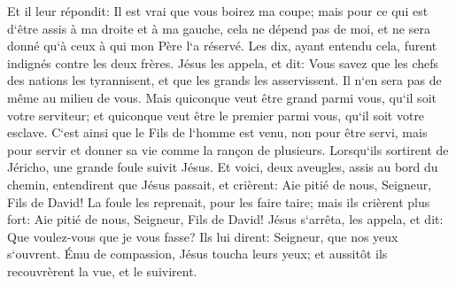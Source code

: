 \verse Et il leur répondit: Il est vrai que vous boirez ma coupe; mais pour ce qui est d`être assis à ma droite et à ma gauche, cela ne dépend pas de moi, et ne sera donné qu`à ceux à qui mon Père l`a réservé. 
\verse Les dix, ayant entendu cela, furent indignés contre les deux frères. 
\verse Jésus les appela, et dit: Vous savez que les chefs des nations les tyrannisent, et que les grands les asservissent. 
\verse Il n`en sera pas de même au milieu de vous. Mais quiconque veut être grand parmi vous, qu`il soit votre serviteur; 
\verse et quiconque veut être le premier parmi vous, qu`il soit votre esclave. 
\verse C`est ainsi que le Fils de l`homme est venu, non pour être servi, mais pour servir et donner sa vie comme la rançon de plusieurs. 
\verse Lorsqu`ils sortirent de Jéricho, une grande foule suivit Jésus. 
\verse Et voici, deux aveugles, assis au bord du chemin, entendirent que Jésus passait, et crièrent: Aie pitié de nous, Seigneur, Fils de David! 
\verse La foule les reprenait, pour les faire taire; mais ils crièrent plus fort: Aie pitié de nous, Seigneur, Fils de David! 
\verse Jésus s`arrêta, les appela, et dit: Que voulez-vous que je vous fasse? 
\verse Ils lui dirent: Seigneur, que nos yeux s`ouvrent. 
\verse Ému de compassion, Jésus toucha leurs yeux; et aussitôt ils recouvrèrent la vue, et le suivirent. 

\chapter{}

